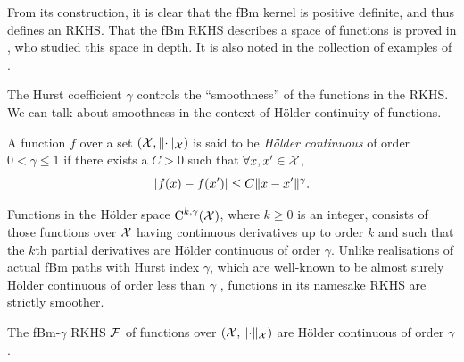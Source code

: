 From its construction, it is clear that the fBm kernel is positive definite, and thus defines an RKHS.
That the fBm RKHS describes a space of functions is proved in \citet{cohen2002}, who studied this space in depth. 
It is also noted in the collection of examples of \citet[pp.71 \& 319]{berlinet2011reproducing}.

The Hurst coefficient $\gamma$ controls the ``smoothness'' of the functions in the RKHS. 
We can talk about smoothness in the context of Hölder continuity of functions.

\begin{definition}
  A function $f$ over a set $({\mathcal X}, \lVert\cdot\rVert_{\mathcal X})$ is said to be \emph{Hölder continuous} of order $0 <\gamma\leq 1$ if there exists a $C>0$ such that $\forall x,x'\in{\mathcal X}$,
  \[
    \vert f(x) - f(x') \vert \leq C \lVert x-x'\rVert^\gamma.
  \]
\end{definition}

Functions in the Hölder space $\text{C}^{k,\gamma}({\mathcal X})$, where $k\geq 0$ is an integer, consists of those functions over ${\mathcal X}$ having continuous derivatives up to order $k$ and such that the $k$th partial derivatives are Hölder continuous of order $\gamma$.
Unlike realisations of actual fBm paths with Hurst index $\gamma$, which are well-known to be almost surely Hölder continuous of order less than $\gamma$ \citep[Theorem 4.1.1]{embrechts2002selfsimilar}, functions in its namesake RKHS are strictly smoother.


\begin{claim}
  The fBm-$\gamma$ RKHS ${\mathcal F}$ of functions over $({\mathcal X}, \lVert\cdot\rVert_{\mathcal X})$ are Hölder continuous of order $\gamma$.
\end{claim}

